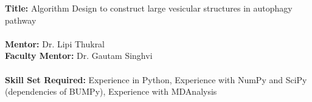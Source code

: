 \documentclass[12pt, a4paper]{report}
\begin{document}
\textbf{Title:} Algorithm Design to construct large vesicular structures in autophagy pathway 
\\~\\
\textbf{Mentor: }Dr. Lipi Thukral 
\\\textbf{Faculty Mentor:} Dr. Gautam Singhvi 
\\~\\
\textbf{Skill Set Required:} Experience in Python, Experience with NumPy and SciPy (dependencies of BUMPy), Experience with MDAnalysis
\\~\\
	
\end{document}
